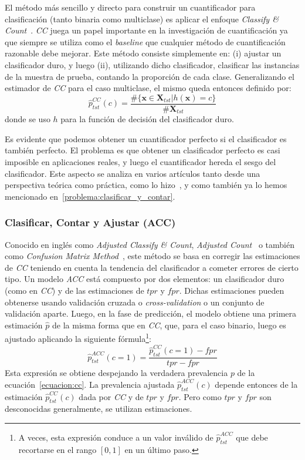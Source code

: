 El método más sencillo y directo para construir un cuantificador para
clasificación (tanto binaria como multiclase) es aplicar el enfoque {\it
Classify \& Count\/}~\cite{forman2005counting}. {\it CC\/} juega un papel
importante en la investigación de cuantificación ya que siempre se utiliza como
el {\it baseline\/} que cualquier método de cuantificación razonable debe
mejorar. Este método consiste simplemente en: (i) ajustar un clasificador duro,
y luego (ii), utilizando dicho clasificador, clasificar las instancias de la
muestra de prueba, contando la proporción de cada clase. Generalizando el
estimador de {\it CC\/} para el caso multiclase, el mismo queda entonces
definido por:
\begin{equation}
    \hat p^{CC}_{tst}(c) = \frac{\#\{\boldsymbol{x} \in \boldsymbol{X}_{tst}|h(\boldsymbol{x})=c\}}{\#\boldsymbol{X}_{tst}}\label{ecuacion:cc}
\end{equation}
donde se uso $h$ para la función de decisión del clasificador duro.

Es evidente que podemos obtener un cuantificador perfecto si el clasificador es
también perfecto. El problema es que obtener un clasificador perfecto es casi
imposible en aplicaciones reales, y luego el cuantificador hereda el sesgo del
clasificador. Este aspecto se analiza en varios artículos tanto desde una
perspectiva teórica como práctica, como lo
hizo~\citeauthor{forman2008quantifying}, y como también ya lo hemos mencionado
en~\ref{problema:clasificar_y_contar}.

\subsubsection{Clasificar, Contar y Ajustar (ACC)}

Conocido en inglés como {\it Adjusted Classify \& Count}, {\it Adjusted
Count\/}~\cite{forman2008quantifying} o también como {\it Confusion Matrix
Method\/}~\cite{saerens2002adjusting}, este método se basa en corregir las
estimaciones de {\it CC\/} teniendo en cuenta la tendencia del clasificador a
cometer errores de cierto tipo. Un modelo {\it ACC\/} está compuesto por dos
elementos: un clasificador duro (como en {\it CC\/}) y de las estimaciones de
$tpr$ y $fpr$. Dichas estimaciones pueden obtenerse usando validación cruzada o
{\it cross-validation\/} o un conjunto de validación aparte. Luego, en la fase
de predicción, el modelo obtiene una primera estimación $\hat p$ de la misma
forma que en {\it CC}, que, para el caso binario, luego es ajustado aplicando la
siguiente fórmula\footnote{A veces, esta expresión conduce a un valor inválido
de $\hat p^{ACC}_{tst}$ que debe recortarse en el rango $[0, 1]$ en un último
paso.}:
\begin{equation}
    \hat p^{ACC}_{tst}(c=1) = \frac{\hat p^{CC}_{tst}(c=1)-fpr}{tpr-fpr}\label{ecuacion:acc_binaria}
\end{equation}
Esta expresión se obtiene despejando la verdadera prevalencia $p$ de la
ecuación~\ref{ecuacion:cc}. La prevalencia ajustada $\hat p^{ACC}_{tst}(c)$
depende entonces de la estimación $\hat p^{CC}_{tst}(c)$ dada por {\it CC\/} y
de $tpr$ y $fpr$. Pero como $tpr$ y $fpr$ son desconocidas generalmente, se
utilizan estimaciones.

